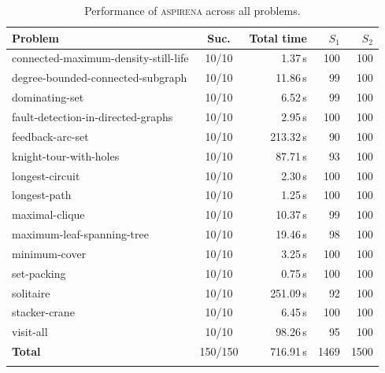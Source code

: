 \begin{table}[htbp]
\centering
\caption{Performance of \textsc{aspirena} across all problems.}
\label{tab:performance-aspirena}
\begin{tabular}{lcrrr}
\toprule
Problem & Suc. & Total time & $S_1$ & $S_2$ \\
\midrule
connected-maximum-density-still-life & 10/10 & 1.37\,s & 100 & 100 \\
degree-bounded-connected-subgraph & 10/10 & 11.86\,s & 99 & 100 \\
dominating-set & 10/10 & 6.52\,s & 99 & 100 \\
fault-detection-in-directed-graphs & 10/10 & 2.95\,s & 100 & 100 \\
feedback-arc-set & 10/10 & 213.32\,s & 90 & 100 \\
knight-tour-with-holes & 10/10 & 87.71\,s & 93 & 100 \\
longest-circuit & 10/10 & 2.30\,s & 100 & 100 \\
longest-path & 10/10 & 1.25\,s & 100 & 100 \\
maximal-clique & 10/10 & 10.37\,s & 99 & 100 \\
maximum-leaf-spanning-tree & 10/10 & 19.46\,s & 98 & 100 \\
minimum-cover & 10/10 & 3.25\,s & 100 & 100 \\
set-packing & 10/10 & 0.75\,s & 100 & 100 \\
solitaire & 10/10 & 251.09\,s & 92 & 100 \\
stacker-crane & 10/10 & 6.45\,s & 100 & 100 \\
visit-all & 10/10 & 98.26\,s & 95 & 100 \\
\midrule
\textbf{Total} & 150/150 & 716.91\,s & 1469 & 1500 \\
\botrule
\end{tabular}
\end{table}

